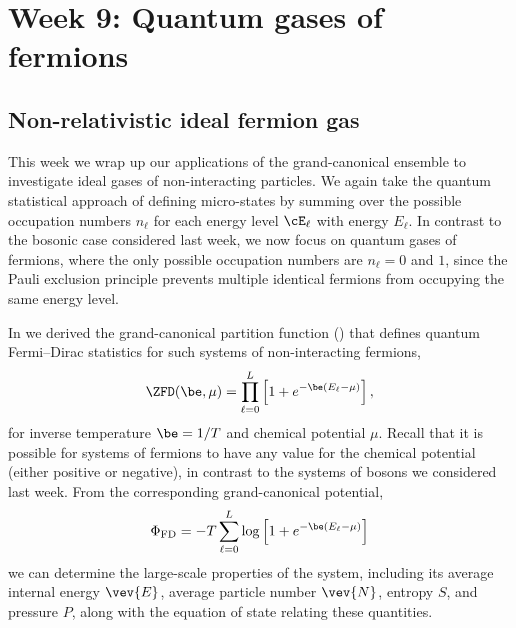 \renewcommand{\thisweek}{MATH327 Week 9}
\renewcommand{\moddate}{Last modified 24 Apr.~2021}
\setcounter{section}{9}
\setcounter{subsection}{0}
{}
\section*{Week 9: Quantum gases of fermions}
\subsection{\label{sec:fermi_nonrel}Non-relativistic ideal fermion gas}
This week we wrap up our applications of the grand-canonical ensemble to investigate ideal gases of non-interacting particles.
We again take the quantum statistical approach of defining micro-states by summing over the possible occupation numbers $n_{\ell}$ for each energy level $\cE_{\ell}$ with energy $E_{\ell}$.
In contrast to the bosonic case considered last week, we now focus on quantum gases of fermions, where the only possible occupation numbers are $n_{\ell} = 0$ and $1$, since the Pauli exclusion principle prevents multiple identical fermions from occupying the same energy level.

In  we derived the grand-canonical partition function () that defines quantum Fermi--Dirac statistics for such systems of non-interacting fermions,
\begin{equation*}
  \ZFD(\be, \mu) = \prod_{\ell = 0}^L \left[1 + e^{-\be (E_{\ell} - \mu)}\right],
\end{equation*}
for inverse temperature $\be = 1 / T$ and chemical potential $\mu$.
Recall that it is possible for systems of fermions to have any value for the chemical potential (either positive or negative), in contrast to the systems of bosons we considered last week.
From the corresponding grand-canonical potential,
\begin{equation*}
  \Phi_{\text{FD}} = -T \sum_{\ell = 0}^L \log\left[1 + e^{-\be (E_{\ell} - \mu)}\right]
\end{equation*}
we can determine the large-scale properties of the system, including its average internal energy $\vev{E}$, average particle number $\vev{N}$, entropy $S$, and pressure $P$, along with the equation of state relating these quantities.

